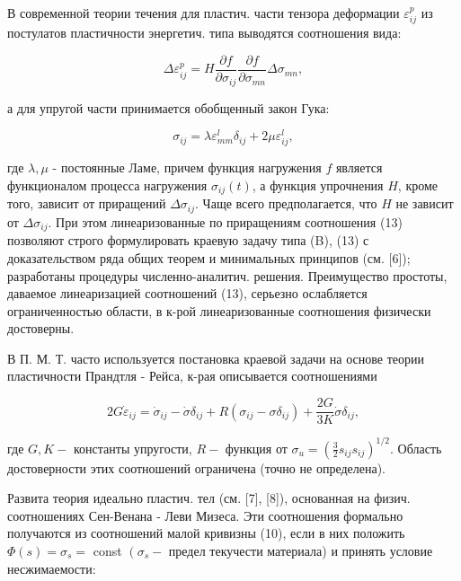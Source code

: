 \documentclass[10pt]{article}
\begin{document}
В современной теории течения для пластич. части тензора деформации $\varepsilon_{i j}^{p}$ из постулатов пластичности энергетич. типа выводятся соотношения вида:



\[

\Delta \varepsilon_{i j}^{p}=H \frac{\partial f}{\partial \sigma_{i j}} \frac{\partial f}{\partial \sigma_{m n}} \Delta \sigma_{m n},

\]



а для упругой части принимается обобщенный закон Гука:



\[

\sigma_{i j}=\lambda \varepsilon_{m m}^{l} \delta_{i j}+2 \mu \varepsilon_{i j}^{l},

\]



где $\lambda, \mu$ - постоянные Ламе, причем функция нагружения $f$ является функционалом процесса нагружения $\sigma_{i j}(t)$, а функция упрочнения $H$, кроме того, зависит от приращений $\Delta \sigma_{i j}$. Чаще всего предполагается, что $H$ не зависит от $\Delta \sigma_{i j}$. При этом линеаризованные по приращениям соотношения (13) позволяют строго формулировать краевую задачу типа (B), (13) с доказательством ряда общих теорем и минимальных принципов (см. [6]); разработаны процедуры численно-аналитич. решения. Преимущество простоты, даваемое линеаризацией соотношений (13), серьезно ослабляется ограниченностью области, в к-рой линеаризованные соотношения физически достоверны.



В П. М. Т. часто используется постановка краевой задачи на основе теории пластичности Прандтля - Рейса, к-рая описывается соотношениями



\[

2 G \dot{\varepsilon}_{i j}=\dot{\sigma}_{i j}-\dot{\sigma} \delta_{i j}+R\left(\sigma_{i j}-\sigma \delta_{i j}\right)+\frac{2 G}{3 K} \dot{\sigma} \delta_{i j},

\]



где $G, K-$ константы упругости, $R-$ функция от $\sigma_{u}=\left(\frac{3}{2} s_{i j} s_{i j}\right)^{1 / 2}$. Область достоверности этих соотношений ограничена (точно не определена).



Развита теория идеально пластич. тел (см. [7], [8]), основанная на физич. соотношениях Сен-Венана - Леви Мизеса. Эти соотношения формально получаются из соотношений малой кривизны (10), если в них положить $\Phi(s)=\sigma_{s}=$ const $\left(\sigma_{s}-\right.$ предел текучести материала) и принять условие несжимаемости:
\end{document}
